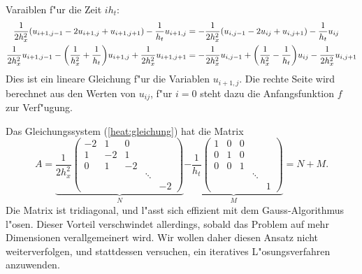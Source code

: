Varaiblen f"ur die Zeit $ih_t$:
\begin{align}
\frac1{2h_x^2}(u_{i+1,j-1}-2u_{i+1,j}+u_{i+1,j+1})-\frac1{h_t}u_{i+1,j}
&=
-\frac1{2h_x^2}(u_{i,j-1}-2u_{ij}+u_{i,j+1})-\frac1{h_t}u_{ij}
\notag
\\
\frac1{2h_x^2}u_{i+1,j-1}
-\biggl(\frac1{h_x^2}+\frac1{h_t}\biggr)u_{i+1,j}
+\frac1{2h_x^2} u_{i+1,j+1}
&=
-\frac1{2h_x^2}u_{i,j-1}
+\biggl(\frac1{h_x^2}-\frac1{h_t}\biggr)u_{ij}
-\frac1{2h_x^2} u_{i,j+1}
\label{heat:gleichung}
\end{align}
Dies ist ein lineare Gleichung f"ur die Variablen $u_{i+1,j}$.
Die rechte Seite wird berechnet aus den Werten von $u_{ij}$,
f"ur $i=0$ steht dazu die Anfangsfunktion $f$ zur Verf"ugung.

Das Gleichungssystem (\ref{heat:gleichung}) hat die Matrix
\begin{equation}
A=
\underbrace{
\frac1{2h_x^2}
\begin{pmatrix}
-2& 1& 0&      &  \\
 1&-2& 1&      &  \\
 0& 1&-2&      &  \\
  &  &  &\ddots&  \\
  &  &  &      &-2
\end{pmatrix}}_N
\underbrace{
-\frac1{h_t}
\begin{pmatrix}
 1& 0& 0&      &  \\
 0& 1& 0&      &  \\
 0& 0& 1&      &  \\
  &  &  &\ddots&  \\
  &  &  &      & 1
\end{pmatrix}}_M
=N + M.
\label{heat:zerlegung}
\end{equation}
Die Matrix ist tridiagonal, und l"asst sich effizient mit dem
Gauss-Algorithmus l"osen.
Dieser Vorteil verschwindet allerdings, sobald das Problem auf
mehr Dimensionen verallgemeinert wird.
Wir wollen daher diesen Ansatz nicht weiterverfolgen, und stattdessen
versuchen, ein iteratives L"osungsverfahren anzuwenden.

